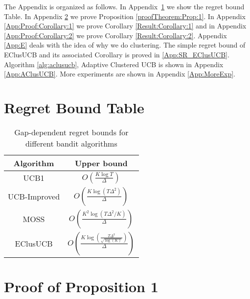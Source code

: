 
\appendix
The Appendix is organized as follows. In Appendix~\ref{App:Table} we show the regret bound Table. In Appendix \ref{App:A} we prove Proposition \ref{proofTheorem:Prop:1}. In Appendix \ref{App:Proof:Corollary:1} we prove Corollary \ref{Result:Corollary:1} and in Appendix \ref{App:Proof:Corollary:2} we prove Corollary \ref{Result:Corollary:2}. Appendix \ref{App:E} deals with the idea of why we do clustering. The simple regret bound of EClusUCB and its associated Corollary is proved in \ref{App:SR_EClusUCB}. Algorithm \ref{alg:aclusucb}, Adaptive Clustered UCB is shown in Appendix \ref{App:AClusUCB}. More experiments are shown in Appendix \ref{App:MoreExp}.

\section{Regret Bound Table}
\label{App:Table}
\begin{table}[!h]
\caption{Gap-dependent regret bounds for different bandit algorithms}
\label{tab:regret-bds}
\begin{center}
\begin{tabular}{|c|c|}
\toprule
Algorithm  & Upper bound \\
\midrule
UCB1         &$O\left(\frac{K\log T}{\Delta}\right)$ \\\midrule
UCB-Improved &$O\left(\frac{K\log (T\Delta^{2})}{\Delta}\right)$ \\\midrule
MOSS	     &$O\left(\frac{K^{2}\log\left(T\Delta^{2}/K\right)}{\Delta}\right)$\\\midrule
EClusUCB      &$O\left(\frac{K\log\left(\frac{T\Delta^{2}}{\sqrt{\log (K)}}\right)}{\Delta}\right)$\\\bottomrule
\end{tabular}
\end{center}
\vspace*{-2em}
\end{table}

\section{Proof of Proposition 1}
\label{App:A}

